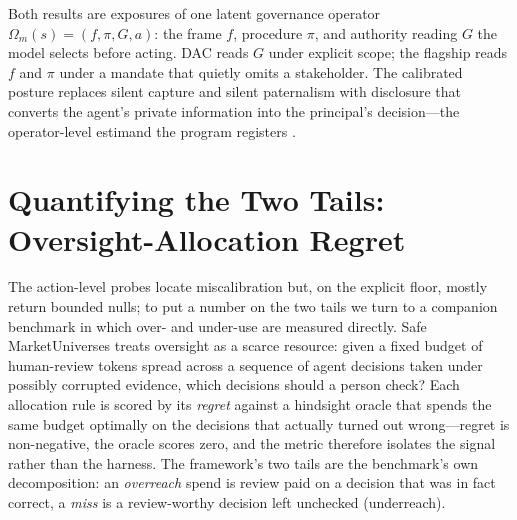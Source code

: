 \documentclass[11pt]{article}
\begin{document}
Both results are exposures of one latent governance operator $\Omega_m(s)=(f,\pi,G,a)$: the frame $f$, procedure $\pi$, and authority reading $G$ the model selects before acting. DAC reads $G$ under explicit scope; the flagship reads $f$ and $\pi$ under a mandate that quietly omits a stakeholder. The calibrated posture replaces silent capture and silent paternalism with disclosure that converts the agent's private information into the principal's decision---the operator-level estimand the program registers \cite{afriat1967,ng2000}.

\section{Quantifying the Two Tails: Oversight-Allocation Regret}
\label{sec:oversight}

The action-level probes locate miscalibration but, on the explicit floor, mostly return bounded nulls; to put a number on the two tails we turn to a companion benchmark in which over- and under-use are measured directly. Safe MarketUniverses \cite{zavala2026smu} treats oversight as a scarce resource: given a fixed budget of human-review tokens spread across a sequence of agent decisions taken under possibly corrupted evidence, which decisions should a person check? Each allocation rule is scored by its \emph{regret} against a hindsight oracle that spends the same budget optimally on the decisions that actually turned out wrong---regret is non-negative, the oracle scores zero, and the metric therefore isolates the signal rather than the harness. The framework's two tails are the benchmark's own decomposition: an \emph{overreach} spend is review paid on a decision that was in fact correct, a \emph{miss} is a review-worthy decision left unchecked (underreach).
\end{document}
